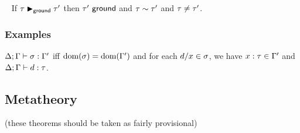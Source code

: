 


{\color{gray}\blindtext}
{\color{gray}\blindtext}
{\color{gray}\blindtext}
{\color{gray}\blindtext}
{\color{gray}\blindtext}

\begin{lemma} ~
  If $\tau \blacktriangleright_{\mathsf{ground}} \tau'$
  then $\tau'~\mathsf{ground}$
  and $\tau \sim \tau'$
  and $\tau\neq\tau'$.
\end{lemma}

\subsubsection{Examples}








  \begin{definition}
    $\Delta; \Gamma \vdash \sigma : \Gamma'$ iff $\text{dom}(\sigma) = \text{dom}(\Gamma')$ and for each $d/x \in \sigma$, we have $x : \tau \in \Gamma'$ and $\Delta; \Gamma \vdash d : \tau$.
  \end{definition}








\clearpage
\subsection{Metatheory }



(these theorems should be taken as fairly provisional)

